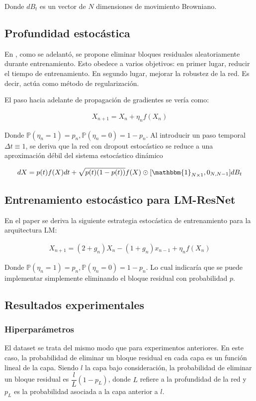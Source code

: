 \documentclass[titlepage,a4paper,oneside]{article}
\begin{document}
Donde $dB_t$ es un vector de $N$ dimensiones de movimiento Browniano.

\subsection{Profundidad estocástica}
En \cite{huang2016deep}, como se adelantó, se propone eliminar bloques residuales aleatoriamente durante entrenamiento. Esto obedece a varios objetivos: en primer lugar, reducir el tiempo de entrenamiento. En segundo lugar, mejorar la robustez de la red. Es decir, actúa como método de regularización.

El paso hacia adelante de propagación de gradientes se vería como:

\begin{align}
	X_{n+1} = X_n + \eta_n f(X_n)
\end{align}

Donde $\mathbb{P}(\eta_n = 1) = p_n, \mathbb{P}(\eta_n = 0) = 1 - p_n$. Al introducir un paso temporal $\Delta t \equiv 1$, se deriva que la red con dropout estocástico se reduce a una aproximación débil del sistema estocástico dinámico

\begin{align}
	dX = p(t) f(X) dt + \sqrt{p(t) (1-p(t))} f(X) \odot [\mathbbm{1}_{N \times 1}, 0_{N, N - 1}] dB_t
\end{align}

\subsection{Entrenamiento estocástico para LM-ResNet}
En el paper se deriva la siguiente estrategia estocástica de entrenamiento para la arquitectura LM:

\begin{align}
	X_{n+1} = (2 + g_n) X_n - (1 + g_n) x_{n-1} + \eta_n f(X_n)
\end{align}

Donde $\mathbb{P}(\eta_n = 1) = p_n, \mathbb{P}(\eta_n = 0) = 1 - p_n$. Lo cual indicaría que se puede implementar simplemente eliminando el bloque residual con probabilidad $p$.

\subsection{Resultados experimentales}
\subsubsection{Hiperparámetros}
El dataset se trata del mismo modo que para experimentos anteriores. En este caso, la probabilidad de eliminar un bloque residual en cada capa es un función lineal de la capa. Siendo $l$ la capa bajo consideración, la probabilidad de eliminar un bloque residual es $\dfrac{l}{L}(1 - p_L)$, donde $L$ refiere a la profundidad de la red y $p_L$ es la probabilidad asociada a la capa anterior a $l$.
\end{document}
